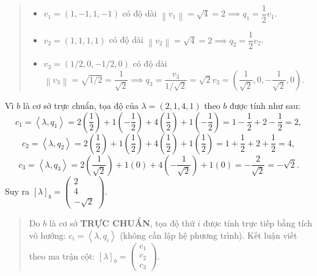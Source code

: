 \documentclass[12pt,a4paper]{article}
\newcommand{\ip}[2]{\left\langle #1,#2\right\rangle}
\newcommand{\norm}[1]{\left\|#1\right\|}
\begin{document}
\begin{quote}
\small
\noindent{}\par\vspace{3pt}
\begin{itemize}[noitemsep,topsep=2pt]
\item $v_1 = (1, -1, 1, -1)$ có độ dài $\norm{v_1} = \sqrt{4} = 2 \implies q_1 = \dfrac{1}{2}v_1$.
\item $v_2 = (1, 1, 1, 1)$ có độ dài $\norm{v_2} = \sqrt{4} = 2 \implies q_2 = \dfrac{1}{2}v_2$.
\item $v_3 = (1/2, 0, -1/2, 0)$ có độ dài $\norm{v_3} = \sqrt{1/2} = \dfrac{1}{\sqrt{2}} \implies q_3 = \dfrac{v_3}{1/\sqrt{2}} = \sqrt{2}v_3 = \left(\dfrac{1}{\sqrt{2}}, 0, -\dfrac{1}{\sqrt{2}}, 0\right)$.
\end{itemize}
\end{quote}

\vspace{0.2cm}
Vì $b$ là cơ sở trực chuẩn, tọa độ của $\lambda = (2, 1, 4, 1)$ theo $b$ được tính như sau:
\[
c_1 = \ip{\lambda}{q_1} = 2\left(\frac{1}{2}\right) + 1\left(-\frac{1}{2}\right) + 4\left(\frac{1}{2}\right) + 1\left(-\frac{1}{2}\right) = 1 - \frac{1}{2} + 2 - \frac{1}{2} = 2,
\]
\[
c_2 = \ip{\lambda}{q_2} = 2\left(\frac{1}{2}\right) + 1\left(\frac{1}{2}\right) + 4\left(\frac{1}{2}\right) + 1\left(\frac{1}{2}\right) = 1 + \frac{1}{2} + 2 + \frac{1}{2} = 4,
\]
\[
c_3 = \ip{\lambda}{q_3} = 2\left(\frac{1}{\sqrt{2}}\right) + 1(0) + 4\left(-\frac{1}{\sqrt{2}}\right) + 1(0) = -\frac{2}{\sqrt{2}} = -\sqrt{2}.
\]
Suy ra $[\lambda]_b = \begin{pmatrix} 2 \\ 4 \\ -\sqrt{2} \end{pmatrix}$.

\begin{quote}
\small
\noindent{}\par\vspace{3pt}
Do $b$ là cơ sở \textbf{TRỰC CHUẨN}, tọa độ thứ $i$ được tính trực tiếp bằng tích vô hướng: $c_i = \ip{\lambda}{q_i}$ (không cần lập hệ phương trình). Kết luận viết theo ma trận cột: $[\lambda]_b = \begin{pmatrix} c_1 \\ c_2 \\ c_3 \end{pmatrix}$.
\end{quote}
\end{document}
